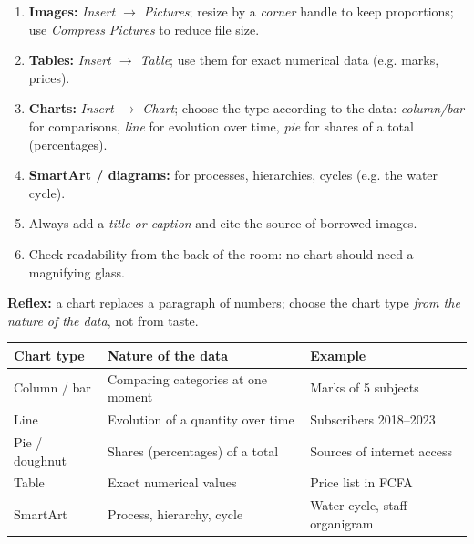 \documentclass[11pt]{article}
\begin{document}
\begin{methode}
\begin{enumerate}
\item \textbf{Images:} \emph{Insert $\rightarrow$ Pictures}; resize by a \emph{corner} handle to keep proportions; use \emph{Compress Pictures} to reduce file size.
\item \textbf{Tables:} \emph{Insert $\rightarrow$ Table}; use them for exact numerical data (e.g. marks, prices).
\item \textbf{Charts:} \emph{Insert $\rightarrow$ Chart}; choose the type according to the data: \emph{column/bar} for comparisons, \emph{line} for evolution over time, \emph{pie} for shares of a total (percentages).
\item \textbf{SmartArt / diagrams:} for processes, hierarchies, cycles (e.g. the water cycle).
\item Always add a \emph{title or caption} and cite the source of borrowed images.
\item Check readability from the back of the room: no chart should need a magnifying glass.
\end{enumerate}
\textbf{Reflex:} a chart replaces a paragraph of numbers; choose the chart type \emph{from the nature of the data}, not from taste.
\end{methode}

\begin{aretenir}
\begin{center}
\begin{tabularx}{\linewidth}{|l|X|X|}
\hline
\rowcolor{popblueL} \textbf{Chart type} & \textbf{Nature of the data} & \textbf{Example} \\
\hline
Column / bar & Comparing categories at one moment & Marks of 5 subjects \\
\hline
Line & Evolution of a quantity over time & Subscribers 2018--2023 \\
\hline
Pie / doughnut & Shares (percentages) of a total & Sources of internet access \\
\hline
Table & Exact numerical values & Price list in FCFA \\
\hline
SmartArt & Process, hierarchy, cycle & Water cycle, staff organigram \\
\hline
\end{tabularx}
\end{center}
\end{aretenir}
\end{document}
